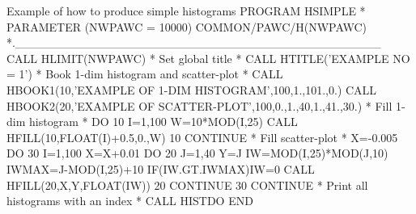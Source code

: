 \begin{XMPt}{Example of how to produce simple histograms}
      PROGRAM HSIMPLE
*
      PARAMETER (NWPAWC = 10000)
      COMMON/PAWC/H(NWPAWC)
*.___________________________________________
      CALL HLIMIT(NWPAWC)
*                       Set global title
*
      CALL HTITLE('EXAMPLE NO = 1')
*                       Book 1-dim histogram and scatter-plot
*
      CALL HBOOK1(10,'EXAMPLE OF 1-DIM HISTOGRAM',100,1.,101.,0.)
      CALL HBOOK2(20,'EXAMPLE OF SCATTER-PLOT',100,0.,1.,40,1.,41.,30.)
*                       Fill 1-dim histogram
*
      DO 10 I=1,100
         W=10*MOD(I,25)
         CALL HFILL(10,FLOAT(I)+0.5,0.,W)
  10  CONTINUE
*                       Fill scatter-plot
*
      X=-0.005
      DO 30 I=1,100
         X=X+0.01
         DO 20 J=1,40
            Y=J
            IW=MOD(I,25)*MOD(J,10)
            IWMAX=J-MOD(I,25)+10
            IF(IW.GT.IWMAX)IW=0
            CALL HFILL(20,X,Y,FLOAT(IW))
  20     CONTINUE
  30  CONTINUE
*                       Print all histograms with an index
*
      CALL HISTDO
      END
\end{XMPt}
\finalnewpage%
